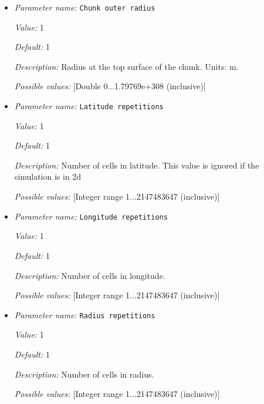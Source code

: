 \begin{itemize}
{\it Value:} 0


{\it Default:} 0


{\it Description:} Minimum longitude of the chunk. Units: degrees.


{\it Possible values:} [Double -180...360 (inclusive)]
\item {\it Parameter name:} {\tt Chunk outer radius}
\label{parameters:Geometry model/Chunk/Chunk outer radius}


{\it Value:} 1


{\it Default:} 1


{\it Description:} Radius at the top surface of the chunk. Units: m.


{\it Possible values:} [Double 0...1.79769e+308 (inclusive)]
\item {\it Parameter name:} {\tt Latitude repetitions}
\label{parameters:Geometry model/Chunk/Latitude repetitions}


{\it Value:} 1


{\it Default:} 1


{\it Description:} Number of cells in latitude. This value is ignored if the simulation is in 2d


{\it Possible values:} [Integer range 1...2147483647 (inclusive)]
\item {\it Parameter name:} {\tt Longitude repetitions}
\label{parameters:Geometry model/Chunk/Longitude repetitions}


{\it Value:} 1


{\it Default:} 1


{\it Description:} Number of cells in longitude.


{\it Possible values:} [Integer range 1...2147483647 (inclusive)]
\item {\it Parameter name:} {\tt Radius repetitions}
\label{parameters:Geometry model/Chunk/Radius repetitions}


{\it Value:} 1


{\it Default:} 1


{\it Description:} Number of cells in radius.


{\it Possible values:} [Integer range 1...2147483647 (inclusive)]
\end{itemize}

